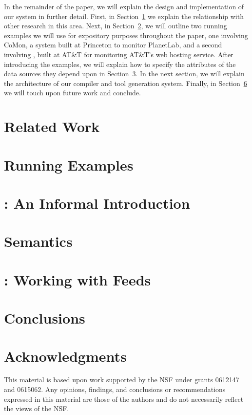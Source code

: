 \documentclass[nocopyrightspace]{sigplanconf}
\begin{document}
In the remainder of the paper, we will explain the design and
implementation of our system in further detail.  First, in Section~\ref{sec:related}
we explain the relationship with other research in this area.  Next, in Section~\ref{sec:examples},
we will outline two running examples we will use for expository purposes throughout the paper, one 
involving CoMon, a system built at Princeton to monitor PlanetLab, and a second involving
\ningaui{}, built at AT\&T for monitoring AT\&T's web hosting service.  After introducing the examples,
we will explain how to specify the attributes of the data sources they depend upon in 
Section~\ref{sec:informal}.  In the next section, we will explain the architecture of our compiler
and tool generation system.  Finally, in Section~\ref{sec:conclusions} we will touch upon future work
and conclude.

\section{Related Work}
\label{sec:related}


\section{Running Examples}
\label{sec:examples}


\section{\padsd{}: An Informal Introduction}
\label{sec:informal}


\section{\padsd{} Semantics}
\label{sec:semantics}


\section{\padsd{}:  Working with Feeds}
\label{sec:programming}


\section{Conclusions}
\label{sec:conclusions}

\section*{Acknowledgments}

This material is based upon work 
supported by the NSF
   under grants 0612147 and 0615062.
Any opinions, findings, and conclusions or recommendations
   expressed in this material are those of the authors and do not
   necessarily reflect the views of the NSF.



\end{document}
